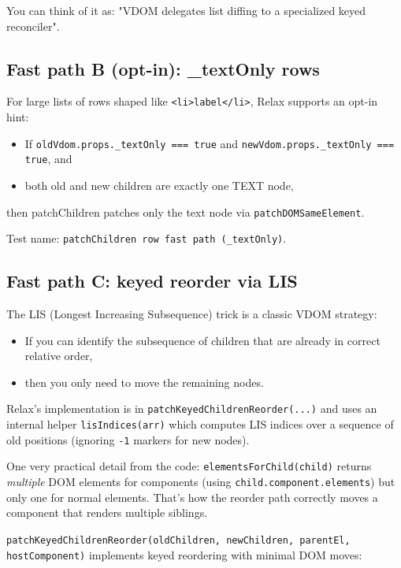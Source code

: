 You can think of it as: "VDOM delegates list diffing to a specialized keyed reconciler".

\subsection{Fast path B (opt-in): \_textOnly rows}

For large lists of rows shaped like \texttt{<li>{label}</li>}, Relax supports an opt-in hint:

\begin{itemize}
  \item If \texttt{oldVdom.props.\_textOnly === true} and \texttt{newVdom.props.\_textOnly === true}, and
  \item both old and new children are exactly one TEXT node,
\end{itemize}

then patchChildren patches only the text node via \texttt{patchDOMSameElement}.

Test name: \texttt{patchChildren row fast path (\_textOnly)}.

\subsection{Fast path C: keyed reorder via LIS}

The LIS (Longest Increasing Subsequence) trick is a classic VDOM strategy:

\begin{itemize}
  \item If you can identify the subsequence of children that are already in correct relative order,
  \item then you only need to move the remaining nodes.
\end{itemize}

Relax's implementation is in \texttt{patchKeyedChildrenReorder(...)} and uses an internal helper \texttt{lisIndices(arr)} which computes LIS indices over a sequence of old positions (ignoring \texttt{-1} markers for new nodes).

One very practical detail from the code: \texttt{elementsForChild(child)} returns \emph{multiple} DOM elements for components (using \texttt{child.component.elements}) but only one for normal elements. That's how the reorder path correctly moves a component that renders multiple siblings.

\texttt{patchKeyedChildrenReorder(oldChildren, newChildren, parentEl, hostComponent)} implements keyed reordering with minimal DOM moves:

